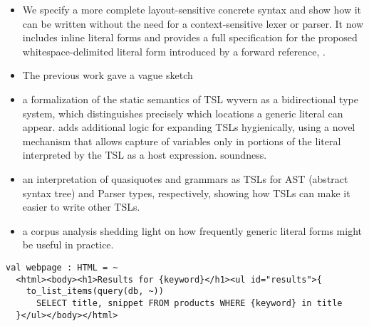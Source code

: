 \begin{itemize}
\item We specify a more complete layout-sensitive concrete syntax and show how it can be written without the need for a context-sensitive lexer or parser. It now includes inline literal forms and provides a full specification for the proposed whitespace-delimited literal form introduced by a forward reference, \li{~}.
\item The previous work gave a vague sketch 
\item a formalization of the static semantics of TSL wyvern as a bidirectional type system, which distinguishes precisely which locations a generic literal can appear. adds additional logic for expanding TSLs hygienically, using a novel mechanism that allows capture of variables only in portions of the literal interpreted by the TSL as a host expression. soundness.
\item an interpretation of quasiquotes and grammars as TSLs for AST (abstract syntax tree) and Parser types, respectively, showing how TSLs can make it easier to write other TSLs.
\item a corpus analysis shedding light on how frequently generic literal forms might be useful in practice.
\end{itemize}

\begin{lstlisting}
val webpage : HTML = ~
  <html><body><h1>Results for {keyword}</h1><ul id="results">{
  	to_list_items(query(db, ~))
      SELECT title, snippet FROM products WHERE {keyword} in title
  }</ul></body></html>
\end{lstlisting}

